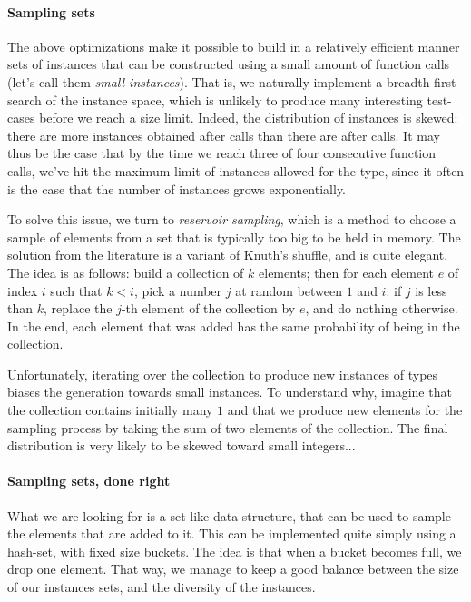 \paragraph{Sampling sets} The above optimizations make it possible to
build in a relatively efficient manner sets of instances that can be
constructed using a small amount of function calls (let's call them
\emph{small instances}). That is, we naturally implement a
breadth-first search of the instance space, which is unlikely to
produce many interesting test-cases before we reach a size limit.
%
Indeed, the distribution of instances is skewed: there are more
instances obtained after  calls than there are after
 calls. It may thus be the case that by the time we reach
three of four consecutive function calls, we've hit the maximum limit
of instances allowed for the type, since it often is the case that the
number of instances grows exponentially.

To solve this issue, we turn to \emph{reservoir sampling}, which is a
method to choose a sample of elements from a set that is typically too
big to be held in memory.
%
The solution from the literature is a variant of Knuth's shuffle, and
is quite elegant. The idea is as follows: build a collection of $k$
elements; then for each element $e$ of index $i$ such that $k < i$,
pick a number $j$ at random between $1$ and $i$: if $j$ is less than
$k$, replace the $j$-th element of the collection by $e$, and do
nothing otherwise. In the end, each element that was added has the same
probability of being in the collection.

Unfortunately, iterating over the collection to produce new instances
of types biases the generation towards small instances. To understand
why, imagine that the collection contains initially many $1$ and that
we produce new elements for the sampling process by taking the sum of
two elements of the collection. The final distribution is very likely
to be skewed toward small integers...

\paragraph{Sampling sets, done right} What we are looking for is a
set-like data-structure, that can be used to sample the elements that
are added to it.
%
This can be implemented quite simply using a hash-set, with fixed size
buckets. The idea is that when a bucket becomes full, we drop one
element. That way, we manage to keep a good balance between the size
of our instances sets, and the diversity of the instances.

